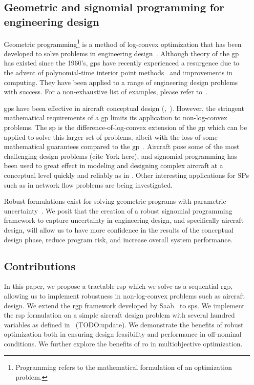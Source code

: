 \subsection{Geometric and signomial programming for engineering design}

Geometric programming\footnote{Programming refers to the mathematical formulation of an optimization problem.}
is a method of log-convex optimization that has been developed
to solve problems in engineering design~\cite{Duffin1967}. Although theory of the \gls{gp} has existed since
the 1960's, \gls{gp}s have recently experienced a resurgence due to the advent of polynomial-time
interior point methods~\cite{Nesterov1994} and improvements in computing. They have been
applied to a range of engineering design problems with success. For a non-exhaustive list of examples,
please refer to~\cite{Boyd2007}.

\gls{gp}s have been effective in aircraft conceptual design
(\cite{Hoburg2013},~\cite{Burton2017}).
However, the stringent mathematical requirements of a \gls{gp} limits its application to non-log-convex problems.
The \gls{sp} is the difference-of-log-convex extension of the \gls{gp} which can be applied to
solve this larger set of problems, albeit with the loss of some mathematical guarantees compared to the \gls{gp}~\cite{Kirschen2018}.
Aircraft pose some of the most challenging design problems (cite York here), and signomial programming
has been used to great effect in modeling and designing complex aircraft at a conceptual level quickly
and reliably as in \cite{York2018} \cite{Kirschen2016} \cite{Kirschen2018}.
Other interesting applications for SPs such as in network flow problems are being investigated.

Robust formulations exist for solving geometric programs with parametric uncertainty~\cite{Saab2018}.
We posit that the creation of a robust signomial programming framework to capture uncertainty in engineering
design, and specifically aircraft design, will allow us to have more confidence in the results
of the conceptual design phase, reduce program risk, and increase overall system performance.

\subsection{Contributions}

In this paper, we propose a tractable \gls{rsp} which we solve as a sequential \gls{rgp},
allowing us to implement robustness in non-log-convex problems such as aircraft design.
We extend the \gls{rgp} framework developed by Saab~\cite{Saab2018} to \gls{sp}s.
We implement the \gls{rsp} formulation on a simple aircraft design problem with several hundred
variables as defined in~\cite{Ozturk2018} (TODO:update).
We demonstrate the benefits of robust optimization both in ensuring design feasibility and performance
in off-nominal conditions. We further explore the benefits of \gls{ro} in multiobjective optimization.

